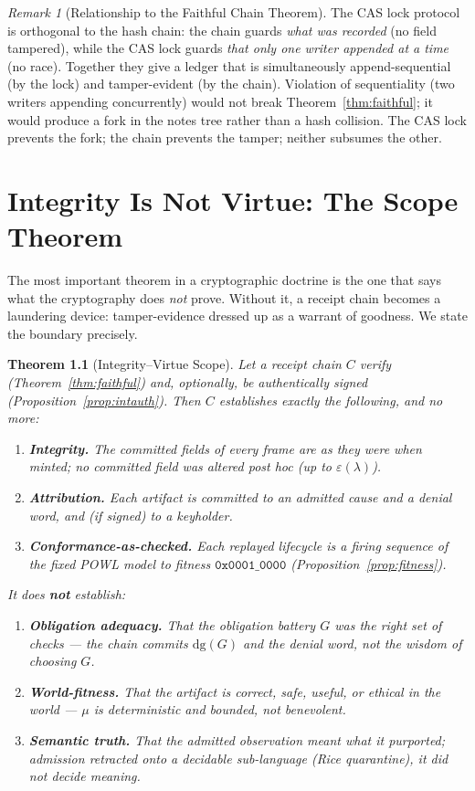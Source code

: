 \documentclass[11pt,oneside]{book}
\theoremstyle{definition}
\theoremstyle{plain}
\newtheorem{theorem}{Theorem}[chapter]
\theoremstyle{remark}
\newtheorem*{remark}{Remark}
\newcommand{\muop}{\mu}                        %
\newcommand{\dg}{\mathrm{dg}}                   %
\newcommand{\code}[1]{\texttt{#1}}
\newcommand{\Ledger}{C}               %
\begin{document}
\begin{remark}[Relationship to the Faithful Chain Theorem]
The CAS lock protocol is orthogonal to the hash chain: the chain guards \emph{what was
recorded} (no field tampered), while the CAS lock guards \emph{that only one writer
appended at a time} (no race). Together they give a ledger that is simultaneously
append-sequential (by the lock) and tamper-evident (by the chain). Violation of
sequentiality (two writers appending concurrently) would not break Theorem~\ref{thm:faithful};
it would produce a fork in the notes tree rather than a hash collision. The CAS lock
prevents the fork; the chain prevents the tamper; neither subsumes the other.
\end{remark}

\chapter{Integrity Is Not Virtue: The Scope Theorem}
\label{ch:scope}

The most important theorem in a cryptographic doctrine is the one that says what the
cryptography does \emph{not} prove. Without it, a receipt chain becomes a laundering device:
tamper-evidence dressed up as a warrant of goodness. We state the boundary precisely.

\begin{theorem}[Integrity--Virtue Scope]\label{thm:scope}
Let a receipt chain $\Ledger$ verify (Theorem~\ref{thm:faithful}) and, optionally, be
authentically signed (Proposition~\ref{prop:intauth}). Then $\Ledger$ establishes exactly the
following, and no more:
\begin{enumerate}[label=(\Alph*),leftmargin=*]
\item \textbf{Integrity.} The committed fields of every frame are as they were when minted;
no committed field was altered post hoc (up to $\varepsilon(\lambda)$).
\item \textbf{Attribution.} Each artifact is committed to an admitted cause and a denial word,
and (if signed) to a keyholder.
\item \textbf{Conformance-as-checked.} Each replayed lifecycle is a firing sequence of the
\emph{fixed} POWL model to fitness $\code{0x0001\_0000}$ (Proposition~\ref{prop:fitness}).
\end{enumerate}
It does \textbf{not} establish:
\begin{enumerate}[label=(\alph*),leftmargin=*]
\item \textbf{Obligation adequacy.} That the obligation battery $G$ was the \emph{right} set of
checks --- the chain commits $\dg(G)$ and the denial word, not the wisdom of choosing $G$.
\item \textbf{World-fitness.} That the artifact is correct, safe, useful, or ethical in the
world --- $\muop$ is deterministic and bounded, not benevolent.
\item \textbf{Semantic truth.} That the admitted observation \emph{meant} what it purported;
admission retracted onto a decidable sub-language (Rice quarantine), it did not decide meaning.
\end{enumerate}
\end{theorem}
\end{document}
